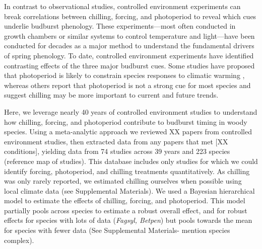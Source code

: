 \documentclass[11pt,letter]{article}
\begin{document}
\par In contrast to observational studies, controlled environment experiments can break correlations between chilling, forcing, and photoperiod to reveal which cues underlie budburst phenology. These experiments---most often conducted in growth chambers or similar systems to control temperature and light---have been conducted for decades as a major method to understand the fundamental drivers of spring phenology. To date, controlled environment experiments have identified contrasting effects of the three major budburst cues. Some studies have proposed that photoperiod is likely to constrain species responses to climatic warming \citep{Basler:2012, Caffarra:2011b,Caffarra:2011a}, whereas others report that photoperiod is not a strong cue for most species \citep{zohner2016,Laube:2014a} and suggest chilling may be more important to current and future trends. 

\par Here, we leverage nearly 40 years of controlled environment studies to understand how chilling, forcing, and photoperiod contribute to budburst timing in woody species. Using a meta-analytic approach we reviewed XX papers from controlled environment studies, then extracted data from any papers that met [XX conditions], yielding data from 74 studies across 39 years and 223 species (reference map of studies).  This database includes only studies for which we could identify forcing, photoperiod, and chilling treatments quantitatively. As chilling was only rarely reported, we estimated chilling ourselves when possible using local climate data (see Supplemental Materials). We used a Bayesian hierarchical model to estimate the effects of chilling, forcing, and photoperiod. This model partially pools across species to estimate a robust overall effect, and for robust effects for species with lots of data (\emph{Fagsyl, Betpen}) but pools towards the mean for species with fewer data (See Supplemental Materials- mention species complex).\\
\end{document}
